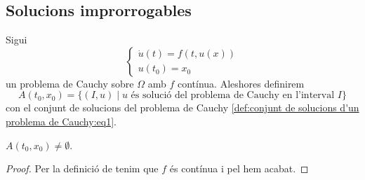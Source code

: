 \documentclass[../../Main.tex]{subfiles}
\begin{document}
	\subsection{Solucions improrrogables}
	\begin{definition}
		\label{def:conjunt de solucions d'un problema de Cauchy}
		Sigui
		\begin{equation}
			\label{def:conjunt de solucions d'un problema de Cauchy:eq1}
			\begin{cases}
				\displaystyle \dot{u}(t)=f(t,u(x)) \\
				\displaystyle u(t_{0})=x_{0}
			\end{cases}
		\end{equation}
		un problema de Cauchy sobre \(\Omega\) amb \(f\) contínua.
		Aleshores definirem
		\[
		    A(t_{0},x_{0})=\{(I,u)\mid u\text{ és solució del problema de Cauchy en l'interval }I\}
		\]
		con el conjunt de solucions del problema de Cauchy \eqref{def:conjunt de solucions d'un problema de Cauchy:eq1}.
	\end{definition}
	\begin{observation}
		\label{obs:el conjunt de solucions d'un problema de Cauchy amb f contínua és no buit}
		\(A(t_{0},x_{0})\neq\emptyset\).
		\begin{proof}
			Per la definició de  tenim que \(f\) és contínua i pel  hem acabat.
		\end{proof}
	\end{observation}
\end{document}
